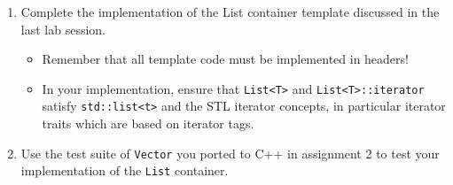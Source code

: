 \begin{homeworkProblem}
    \begin{enumerate}
        \item Complete the implementation of the List container template discussed in the last lab session.
        \begin{itemize}
            \item Remember that all template code must be implemented in headers!
            \item In your implementation, ensure that \texttt{List<T>} and \texttt{List<T>::iterator} satisfy \texttt{std::list<t>} and the STL iterator concepts, in particular iterator traits which are based on iterator tags.
        \end{itemize}
        \item Use the test suite of \texttt{Vector} you ported to C++ in assignment 2 to test your implementation of the \texttt{List} container.
    \end{enumerate}
\end{homeworkProblem}

